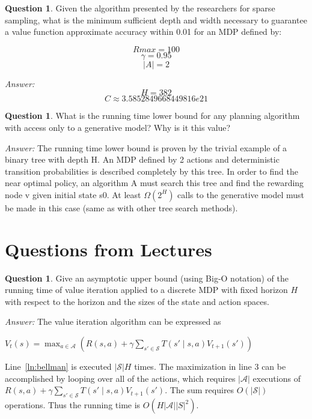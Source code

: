 \documentclass{article}
\theoremstyle{definition}
\newtheorem{question}[thm]{Question}
\newenvironment{answer}{\noindent\textit{Answer:}}{}
\begin{document}
\begin{question}
    Given the algorithm presented by the researchers for sparse sampling, what
is the minimum sufficient depth and width necessary to guarantee a value
function approximate accuracy within 0.01 for an MDP defined by:

$$Rmax = 100$$
$$\gamma = 0.95$$
$$|A| = 2$$
\end{question}

\begin{answer}
$$H = 382$$
$$C \approx 3.5852849668449816e21$$
\end{answer}

\begin{question}
    What is the running time lower bound for any planning algorithm with access only to a generative model?  Why is it this value?
\end{question}

\begin{answer}
    The running time lower bound is proven by the trivial example of a binary tree with depth H.
An MDP defined by 2 actions and deterministic transition probabilities is described completely
by this tree. In order to find the near optimal policy, an algorithm A must search this tree
and find the rewarding node v given initial state s0. At least $\Omega(2^H)$ calls to the generative
model must be made in this case (same as with other tree search methods).
\end{answer}

\section{Questions from Lectures}

\begin{question}
    Give an asymptotic upper bound (using Big-O notation) of the running time of value iteration applied to a discrete MDP with fixed horizon $H$ with respect to the horizon and the sizes of the state and action spaces.
\end{question}

\begin{answer}
    The value iteration algorithm can be expressed as
    \begin{algorithmic}[1]
            \State $V_t(s) = \max_{a \in \mathcal{A}}\left(R(s, a) + \gamma \sum_{s'\in\mathcal{S}} T(s'\mid s, a) V_{t+1}(s')\right)$ \label{ln:bellman}
            \EndFor
        \EndFor
    \end{algorithmic}
    Line~\ref{ln:bellman} is executed $|\mathcal{S}| H$ times.
    The maximization in line 3 can be accomplished by looping over all of the actions, which requires $|\mathcal{A}|$ executions of $R(s, a) + \gamma \sum_{s'\in\mathcal{S}} T(s'\mid s, a) V_{t+1}(s')$. 
    The sum requires $O(|\mathcal{S}|)$ operations. Thus the running time is $O(H|\mathcal{A}||S|^2)$.
\end{answer}
\end{document}
